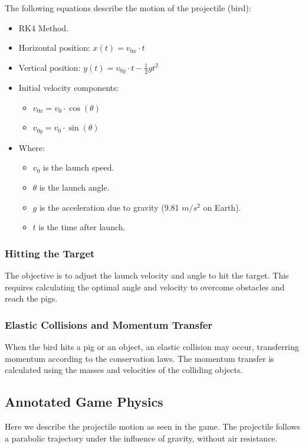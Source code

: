 \documentclass[12pt]{article}
\begin{document}
The following equations describe the motion of the projectile (bird):
\begin{itemize}
    \item RK4 Method.
    \item Horizontal position: \( x(t) = v_{0x} \cdot t \)
    \item Vertical position: \( y(t) = v_{0y} \cdot t - \frac{1}{2} g t^2 \)
    \item Initial velocity components:
    \begin{itemize}
        \item \( v_{0x} = v_0 \cdot \cos(\theta) \)
        \item \( v_{0y} = v_0 \cdot \sin(\theta) \)
    \end{itemize}
    \item Where:
    \begin{itemize}
        \item \( v_0 \) is the launch speed.
        \item \( \theta \) is the launch angle.
        \item \( g \) is the acceleration due to gravity (9.81 \( m/s^2 \) on Earth).
        \item \( t \) is the time after launch.
    \end{itemize}
\end{itemize}

\subsubsection*{Hitting the Target}
The objective is to adjust the launch velocity and angle to hit the target. This requires calculating the optimal angle and velocity to overcome obstacles and reach the pigs.

\subsubsection*{Elastic Collisions and Momentum Transfer}
When the bird hits a pig or an object, an elastic collision may occur, transferring momentum according to the conservation laws. The momentum transfer is calculated using the masses and velocities of the colliding objects.

\subsection{Annotated Game Physics}

Here we describe the projectile motion as seen in the game. The projectile follows a parabolic trajectory under the influence of gravity, without air resistance.
\end{document}
